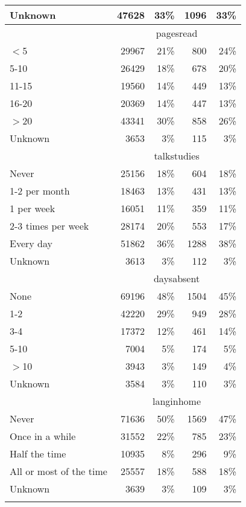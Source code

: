 \begin{longtable}{lrrrr}
  Unknown & 47628 & 33\% & 1096 & 33\% \\ 
   \hline & \multicolumn{4}{c}{pagesread} \\ \cline{2-5} $<$5 & 29967 & 21\% & 800 & 24\% \\ 
  5-10 & 26429 & 18\% & 678 & 20\% \\ 
  11-15 & 19560 & 14\% & 449 & 13\% \\ 
  16-20 & 20369 & 14\% & 447 & 13\% \\ 
  $>$20 & 43341 & 30\% & 858 & 26\% \\ 
  Unknown & 3653 & 3\% & 115 & 3\% \\ 
   \hline & \multicolumn{4}{c}{talkstudies} \\ \cline{2-5} Never & 25156 & 18\% & 604 & 18\% \\ 
  1-2 per month & 18463 & 13\% & 431 & 13\% \\ 
  1 per week & 16051 & 11\% & 359 & 11\% \\ 
  2-3 times per week & 28174 & 20\% & 553 & 17\% \\ 
  Every day & 51862 & 36\% & 1288 & 38\% \\ 
  Unknown & 3613 & 3\% & 112 & 3\% \\ 
   \hline & \multicolumn{4}{c}{daysabsent} \\ \cline{2-5} None & 69196 & 48\% & 1504 & 45\% \\ 
  1-2 & 42220 & 29\% & 949 & 28\% \\ 
  3-4 & 17372 & 12\% & 461 & 14\% \\ 
  5-10 & 7004 & 5\% & 174 & 5\% \\ 
  $>$10 & 3943 & 3\% & 149 & 4\% \\ 
  Unknown & 3584 & 3\% & 110 & 3\% \\ 
   \hline & \multicolumn{4}{c}{langinhome} \\ \cline{2-5} Never & 71636 & 50\% & 1569 & 47\% \\ 
  Once in a while & 31552 & 22\% & 785 & 23\% \\ 
  Half the time & 10935 & 8\% & 296 & 9\% \\ 
  All or most of the time & 25557 & 18\% & 588 & 18\% \\ 
  Unknown & 3639 & 3\% & 109 & 3\% \\ 
  \hline
\label{g4mathstudent}
\end{longtable}
